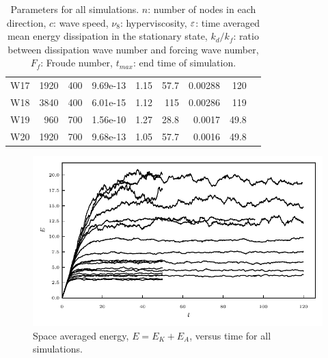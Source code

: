 \begin{table}
\begin{center}
\begin{tabular}{lrrrrrrrr}
W17 &  1920 &  400 & 9.69e-13 &        1.15 &                    57.7 & 0.00288 &                 120 \\
W18 &  3840 &  400 & 6.01e-15 &        1.12 &                     115 & 0.00286 &                119 \\
W19 &   960 &  700 & 1.56e-10 &        1.27 &                    28.8 &  0.0017 &                49.8 \\
W20 &  1920 &  700 & 9.68e-13 &        1.05 &                    57.7 &  0.0016 &                49.8 \\
\bottomrule

\end{tabular}
\caption{Parameters for all simulations. $ n $: number of nodes in each direction, $ c $: wave speed, $ \nu_8 $: hyperviscosity, $ \varepsilon $: time averaged mean energy dissipation in the stationary state, $ k_{d}/ k_f $: ratio between dissipation wave number and forcing wave number, $ F_f  $: Froude number, $ t_{max} $:   end time of simulation.}
\end{center}
\end{table}





\begin{figure}
\centerline{\includegraphics[width=5.12in]{../Pyfig/fig_Emean_time}}
\caption{Space averaged energy, 
$E = E_K + E_A $, versus time 
for all simulations. }
\label{fig_Evstime}
\end{figure}

